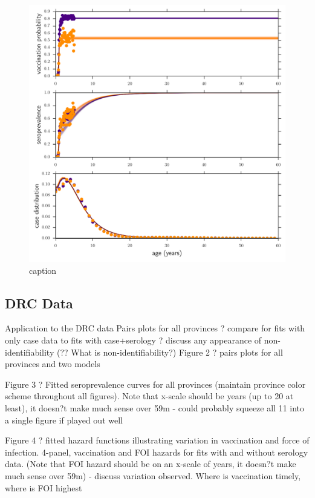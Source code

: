 \documentclass[nofootinbib,aps,pre,twocolumn,superscriptaddress,showkeys,showpacs]{revtex4-1}
\begin{document}
\begin{figure}
\includegraphics[width=\columnwidth,angle=0]{figures/vsc_simdata_vaxcase.pdf}
\caption{caption\label{fig:svcsimdata}}
\end{figure}

\subsection{DRC Data \label{subsec:DRC}}
Application to the DRC data
	Pairs plots for all provinces ? compare for fits with only case data to fits with case+serology ? discuss any appearance of non-identifiability (?? What is non-identifiability?)	
Figure 2 ? pairs plots for all provinces and two models
	

Figure 3 ? Fitted seroprevalence curves for all provinces (maintain province color scheme throughout all figures). Note that x-scale should be years (up to 20 at least), it doesn?t make much sense over 59m
	- could probably squeeze all 11 into a single figure if played out well

Figure 4 ? fitted hazard functions illustrating variation in vaccination and force of infection.  4-panel, vaccination and FOI hazards for fits with and without serology data. (Note that FOI hazard should be on an x-scale of years, it doesn?t make much sense over 59m)
	- discuss variation observed.  Where is vaccination timely, where is FOI highest
\end{document}
